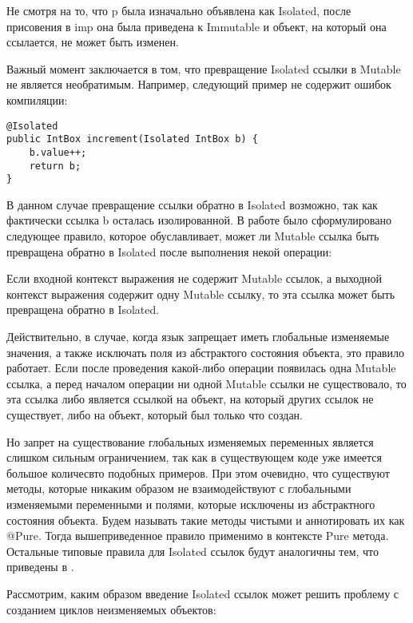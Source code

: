Не смотря на то, что p была изначально объявлена как Isolated, после присовения в imp она была приведена к Immutable и объект, на который она ссылается, не может быть изменен.

Важный момент заключается в том, что превращение Isolated ссылки в Mutable не является необратимым. Например, следующий пример не содержит ошибок компиляции:

\begin{lstlisting}[caption=Превращение Isolated ссылки в Mutable и обратно, label=code:isolated_to_mutable_and_back]
@Isolated
public IntBox increment(Isolated IntBox b) { 
    b.value++; 
    return b;
}
\end{lstlisting}

В данном случае превращение ссылки обратно в Isolated возможно, так как фактически ссылка b осталась изолированной. В работе \cite{Gordon2012} было сформулировано следующее правило, которое обуславливает, может ли Mutable ссылка быть превращена обратно в Isolated после выполнения некой операции:

\begin{Rule}\label{rule:convert_isolated}
Если входной контекст выражения не содержит Mutable ссылок, а выходной контекст выражения содержит одну Mutable ссылку, то эта ссылка может быть превращена обратно в Isolated.
\end{Rule}

Действительно, в случае, когда язык запрещает иметь глобальные изменяемые значения, а также исключать поля из абстрактого состояния объекта, это правило работает. Если после проведения какой-либо операции появилась одна Mutable ссылка, а перед началом операции ни одной Mutable ссылки не существовало, то эта ссылка либо является ссылкой на объект, на который других ссылок не существует, либо на объект, который был только что создан. 

Но запрет на существование глобальных изменяемых переменных является слишком сильным ограничением, так как в существующем коде уже имеется большое количесвто подобных примеров. При этом очевидно, что существуют методы, которые никаким образом не взаимодействуют с глобальными изменяемыми переменными и полями, которые исключены из абстрактного состояния объекта. Будем называть такие методы чистыми и аннотировать их как @Pure. Тогда вышеприведенное правило применимо в контексте Pure метода. Остальные типовые правила для Isolated ссылок будут аналогичны тем, что приведены в \cite{Gordon2012}.

Рассмотрим, каким образом введение Isolated ссылок может решить проблему с созданием циклов неизменяемых объектов:

